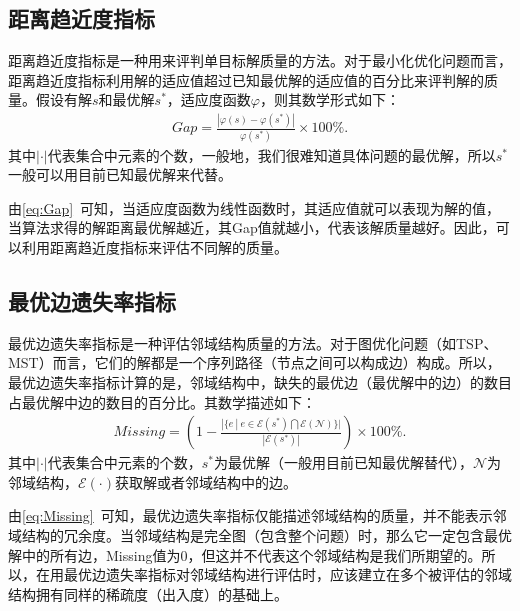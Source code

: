\subsection{距离趋近度指标}
\label{subsec:背景介绍:性能评价指标:距离趋近度指标}
距离趋近度指标是一种用来评判单目标解质量的方法。对于最小化优化问题而言，距离趋近度指标利用解的适应值超过已知最优解的适应值的百分比来评判解的质量。假设有解$s$和最优解$s^*$，适应度函数$\varphi$，则其数学形式如下：
\begin{align}
    \label{eq:Gap}
    Gap = \frac{|\varphi (s) - \varphi (s^*)|}{\varphi (s^*)} \times 100\%.
\end{align}
其中$| \cdot  \vert $代表集合中元素的个数，一般地，我们很难知道具体问题的最优解，所以$s^*$一般可以用目前已知最优解来代替。
\par
由\autoref{eq:Gap}~可知，当适应度函数为线性函数时，其适应值就可以表现为解的值，当算法求得的解距离最优解越近，其Gap值就越小，代表该解质量越好。因此，可以利用距离趋近度指标来评估不同解的质量。

\subsection{最优边遗失率指标}
\label{subsec:背景介绍:性能评价指标:边遗失指标}
最优边遗失率指标是一种评估邻域结构质量的方法。对于图优化问题（如TSP、MST）而言，它们的解都是一个序列路径（节点之间可以构成边）构成。所以，最优边遗失率指标计算的是，邻域结构中，缺失的最优边（最优解中的边）的数目占最优解中边的数目的百分比。其数学描述如下：
\begin{align}
    \label{eq:Missing}
    Missing = (1 - \frac{|\{ e \ | \ e \in  \mathcal{E} (s^*) \bigcap \mathcal{E} (\mathcal{N}) \} |}{|\mathcal{E} (s^*)|}) \times 100\%.
\end{align}
其中$| \cdot  \vert $代表集合中元素的个数，$s^*$为最优解（一般用目前已知最优解替代），$\mathcal{N}$为邻域结构，$\mathcal{E} (\cdot)$获取解或者邻域结构中的边。
\par
由\autoref{eq:Missing}~可知，最优边遗失率指标仅能描述邻域结构的质量，并不能表示邻域结构的冗余度。当邻域结构是完全图（包含整个问题）时，那么它一定包含最优解中的所有边，Missing值为0，但这并不代表这个邻域结构是我们所期望的。所以，在用最优边遗失率指标对邻域结构进行评估时，应该建立在多个被评估的邻域结构拥有同样的稀疏度（出入度）的基础上。


